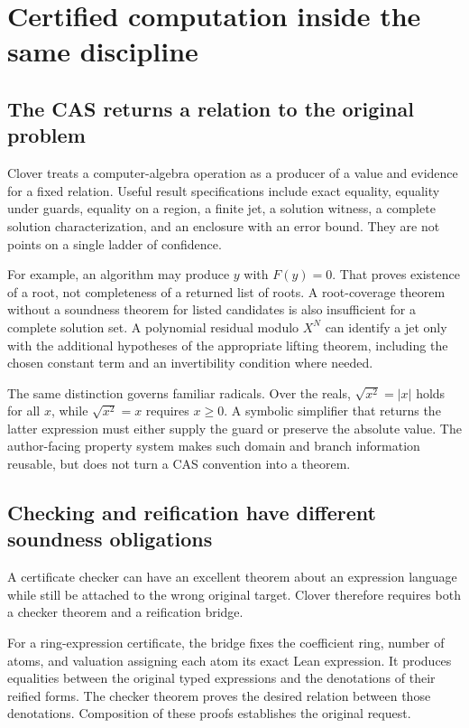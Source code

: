 \documentclass[11pt,a4paper]{article}
\theoremstyle{definition}
\theoremstyle{remark}
\begin{document}
\section{Certified computation inside the same discipline}\label{sec:cas}

\subsection{The CAS returns a relation to the original problem}

Clover treats a computer-algebra operation as a producer of a value and evidence
for a fixed relation. Useful result specifications include exact equality,
equality under guards, equality on a region, a finite jet, a solution witness,
a complete solution characterization, and an enclosure with an error bound.
They are not points on a single ladder of confidence.

For example, an algorithm may produce $y$ with $F(y)=0$. That proves existence
of a root, not completeness of a returned list of roots. A root-coverage theorem
without a soundness theorem for listed candidates is also insufficient for a
complete solution set. A polynomial residual modulo $X^N$ can identify a jet
only with the additional hypotheses of the appropriate lifting theorem,
including the chosen constant term and an invertibility condition where needed.

The same distinction governs familiar radicals. Over the reals,
$\sqrt{x^2}=|x|$ holds for all $x$, while $\sqrt{x^2}=x$ requires $x\ge0$.
A symbolic simplifier that returns the latter expression must either supply the
guard or preserve the absolute value. The author-facing property system makes
such domain and branch information reusable, but does not turn a CAS convention
into a theorem.

\subsection{Checking and reification have different soundness obligations}

A certificate checker can have an excellent theorem about an expression
language while still be attached to the wrong original target. Clover therefore
requires both a checker theorem and a reification bridge.

For a ring-expression certificate, the bridge fixes the coefficient ring,
number of atoms, and valuation assigning each atom its exact Lean expression.
It produces equalities between the original typed expressions and the
denotations of their reified forms. The checker theorem proves the desired
relation between those denotations. Composition of these proofs establishes
the original request.
\end{document}
